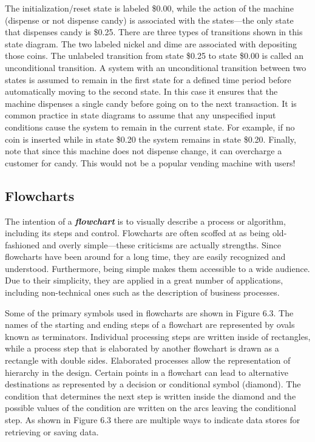 The initialization/reset state is labeled \$0.00, while the action of
the machine (dispense or not dispense candy) is associated with the
states---the only state that dispenses candy is \$0.25. There are three
types of transitions shown in this state diagram. The two labeled nickel
and dime are associated with depositing those coins. The unlabeled
transition from state \$0.25 to state \$0.00 is called an unconditional
transition. A system with an unconditional transition between two states
is assumed to remain in the first state for a defined time period before
automatically moving to the second state. In this case it ensures that
the machine dispenses a single candy before going on to the next
transaction. It is common practice in state diagrams to assume that any
unspecified input conditions cause the system to remain in the current
state. For example, if no coin is inserted while in state \$0.20 the
system remains in state \$0.20. Finally, note that since this machine
does not dispense change, it can overcharge a customer for candy. This
would not be a popular vending machine with users!

\subsection{Flowcharts}\label{flowcharts}

The intention of a \emph{\textbf{flowchart}} is to visually describe a
process or algorithm, including its steps and control. Flowcharts are
often scoffed at as being old-fashioned and overly simple---these
criticisms are actually strengths. Since flowcharts have been around for
a long time, they are easily recognized and understood. Furthermore,
being simple makes them accessible to a wide audience. Due to their
simplicity, they are applied in a great number of applications,
including non-technical ones such as the description of business
processes.

Some of the primary symbols used in flowcharts are shown in Figure 6.3.
The names of the starting and ending steps of a flowchart are
represented by ovals known as terminators. Individual processing steps
are written inside of rectangles, while a process step that is
elaborated by another flowchart is drawn as a rectangle with double
sides. Elaborated processes allow the representation of hierarchy in the
design. Certain points in a flowchart can lead to alternative
destinations as represented by a decision or conditional symbol
(diamond). The condition that determines the next step is written inside
the diamond and the possible values of the condition are written on the
arcs leaving the conditional step. As shown in Figure 6.3 there are
multiple ways to indicate data stores for retrieving or saving data.

